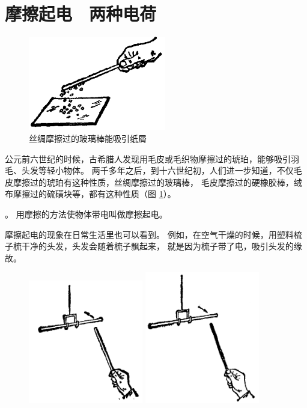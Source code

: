 \section{摩擦起电　两种电荷}\label{sec:7-1}

\begin{figure}
    \centering
    \includegraphics[width=6cm]{../pic/czwl2-ch7-1}
    \caption{丝绸摩擦过的玻璃棒能吸引纸屑}\label{fig:7-1}
\end{figure}

公元前六世纪的时候，古希腊人发现用毛皮或毛织物摩擦过的琥珀，能够吸引羽毛、头发等轻小物体。
两千多年之后，到十六世纪初，人们进一步知道，不仅毛皮摩擦过的琥珀有这种性质，丝绸摩擦过的玻璃棒，
毛皮摩擦过的硬橡胶棒，绒布摩擦过的硫磺块等，都有这种性质（图 \ref{fig:7-1}）。


。
用摩擦的方法使物体带电叫做摩擦起电。

摩擦起电的现象在日常生活里也可以看到。
例如，在空气干燥的时候，用塑料梳子梳干净的头发，头发会随着梳子飘起来，
就是因为梳子带了电，吸引头发的缘故。

\begin{figure}[htbp]
    \centering
    \begin{minipage}{7cm}
    \centering
    \includegraphics[width=5cm]{../pic/czwl2-ch7-2}
    \caption{}\label{fig:7-2}
    \end{minipage}
    \qquad
    \begin{minipage}{7cm}
    \centering
    \includegraphics[width=5cm]{../pic/czwl2-ch7-3}
    \caption{}\label{fig:7-3}
    \end{minipage}
\end{figure}


